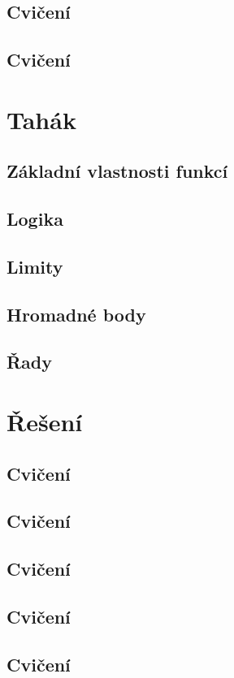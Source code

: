 \documentclass[a4paper,10pt]{book}
\begin{document}
	\section[4. Cvičení]{Cvičení}
 
	\section[5. Cvičení]{Cvičení}
 

\chapter{Tahák}
	\section{Základní vlastnosti funkcí}
	\section{Logika}
		
	\section{Limity}
		
		
	\section{Hromadné body}
	  
	\section{Řady}
	  

\chapter{Řešení}
	\renewcommand{\solution}[1]{
		\emph{Řešení:}
		#1
	}
	\renewcommand{\exercise}[2]{ %
		\label{sol:#2}
		
		\newpage
	}
	\section[1. Cvičení]{Cvičení}
 
	\section[2. Cvičení]{Cvičení}
 
	\section[3. Cvičení]{Cvičení}
 
	\section[4. Cvičení]{Cvičení}
 
	\section[5. Cvičení]{Cvičení}
 
\end{document}

